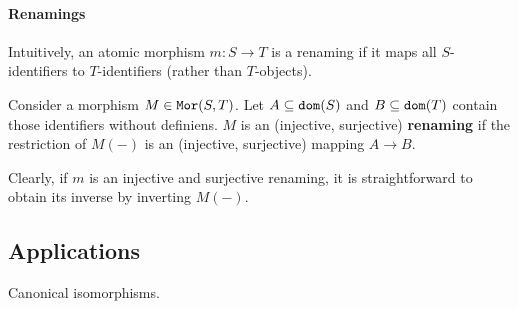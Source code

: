 %
%
%

\paragraph{Renamings}
Intuitively, an atomic morphism $m:S\to T$ is a renaming if it maps all $S$-identifiers to $T$-identifiers (rather than $T$-objects).

\begin{definition}[Renaming]
Consider a morphism $M\in\mathtt{Mor}(S,T)$.
Let $A\subseteq\mathtt{dom}(S)$ and $B\subseteq\mathtt{dom}(T)$ contain those identifiers without definiens.
$M$ is an (injective, surjective) \textbf{renaming} if the restriction of $M(-)$ is an (injective, surjective) mapping $A\to B$.
\end{definition}

Clearly, if $m$ is an injective and surjective renaming, it is straightforward to obtain its inverse by inverting $M(-)$.

\subsection{Applications}

Canonical isomorphisms.

